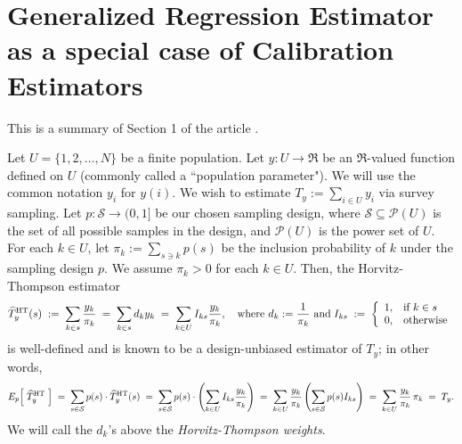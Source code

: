 \documentclass{article}
\begin{document}


\pagestyle{fancy}

%

\lfoot[]{}
\cfoot[]{}
\rfoot[]{\thepage}



\mbox{}\vskip -0.3cm
\section{Generalized Regression Estimator as a special case of Calibration Estimators}
\setcounter{theorem}{0}

This is a summary of Section 1 of the article \cite{DevilleSarndal1992}.

Let $U = \{1,2,\ldots,N\}$ be a finite population.
Let $y : U \longrightarrow \Re$ be an $\Re$-valued function defined on $U$
(commonly called a ``population parameter").
We will use the common notation $y_{i}$ for $y(i)$.
We wish to estimate $T_{y} := \sum_{i \in U} y_{i}$ via survey sampling.
Let $p:\mathcal{S} \longrightarrow (0,1]$ be our chosen sampling design,
where $\mathcal{S} \subseteq \mathcal{P}(U)$ is the set of all possible
samples in the design, and $\mathcal{P}(U)$ is the power set of $U$.
For each $k \in U$, let $\pi_{k} := \sum_{s \ni k}p(s)$ be the inclusion probability
of $k$ under the sampling design $p$.
We assume $\pi_{k} > 0$ for each $k \in U$.
Then, the Horvitz-Thompson estimator
\begin{equation*}
\widehat{T}^{\textnormal{HT}}_{y}(s)
\;:=\;\sum_{k \in s} \dfrac{y_{k}}{\pi_{k}}
\; =\;\sum_{k \in s} d_{k}y_{k}
\; =\;\sum_{k \in U} I_{ks}\dfrac{y_{k}}{\pi_{k}},
\quad
\textnormal{where $d_{k} := \dfrac{1}{\pi_{k}}$ and}
\;
I_{ks} \; := \; \left\{\begin{array}{cl} 1, & \textnormal{if $k \in s$} \\ 0, &  \textnormal{otherwise} \end{array}\right. 
\end{equation*}
is well-defined and is known to be a design-unbiased estimator of $T_{y}$; in other words,
\begin{equation*}
E_{p}\!\left[\;\widehat{T}^{\textnormal{HT}}_{y}\;\right]
\; = \; \sum_{s \in \mathcal{S}} p(s)\cdot \widehat{T}^{\textnormal{HT}}_{y}(s)
\; = \; \sum_{s \in \mathcal{S}} p(s)\cdot\left(\sum_{k \in U} I_{ks}\dfrac{y_{k}}{\pi_{k}}\right)
\; = \; \sum_{k \in U} \dfrac{y_{k}}{\pi_{k}} \left(\sum_{s \in \mathcal{S}} p(s) I_{ks}\right)
\; = \; \sum_{k \in U} \dfrac{y_{k}}{\pi_{k}}\,\pi_{k}
\; = \; T_{y}.
\end{equation*}
We will call the $d_{k}$'s above the \textit{Horvitz-Thompson weights}.
\end{document}
